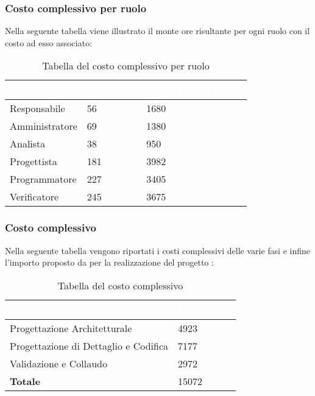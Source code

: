 \clearpage

\subsubsection{Costo complessivo per ruolo}
Nella seguente tabella viene illustrato il monte ore risultante per ogni ruolo con il costo ad esso associato:
{
\renewcommand{\arraystretch}{2}
\centering
\begin{longtable}{ C{3cm} C{2cm} C{4cm}}
\caption{Tabella del costo complessivo per ruolo}\\

\textcolor{white}{\textbf{Ruolo}} & 
\textcolor{white}{\textbf{Totale ore}} & 
\textcolor{white}{\textbf{Costo ruolo in euro}}\\	
\endhead
        
Responsabile   &  56 & 1680 \\
Amministratore &  69 & 1380 \\
Analista       &  38 &  950 \\
Progettista    & 181 & 3982 \\
Programmatore  & 227 & 3405 \\
Verificatore   & 245 & 3675 \\
        	
\end{longtable}
}

\subsubsection{Costo complessivo}
Nella seguente tabella vengono riportati i costi complessivi delle varie fasi e infine l'importo proposto da \Gruppo{} per la realizzazione del progetto \NomeProgetto{}:\\
{
\renewcommand{\arraystretch}{2}
\centering
\begin{longtable}{ C{5cm} C{5cm}}
\caption{Tabella del costo complessivo}\\

\textcolor{white}{\textbf{Fase}} &
\textcolor{white}{\textbf{Costo Fase}}\\	
\endhead
		
Progettazione Architetturale          &  4923 \\
Progettazione di Dettaglio e Codifica &  7177 \\
Validazione e Collaudo                &  2972 \\
\textbf{Totale}                       & 15072 \\

\end{longtable}
}